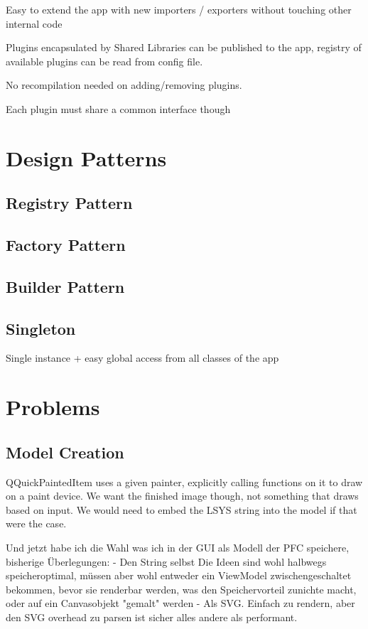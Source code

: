 Easy to extend the app with new importers / exporters without touching other internal code

Plugins encapsulated by Shared Libraries can be published to the app, registry of available plugins can be read from config file.

No recompilation needed on adding/removing plugins.

Each plugin must share a common interface though

\section{Design Patterns}
\subsection{Registry Pattern}

\subsection{Factory Pattern}

\subsection{Builder Pattern}

\subsection{Singleton}
Single instance + easy global access from all classes of the app


\section{Problems}
\subsection{Model Creation}
QQuickPaintedItem uses a given painter, explicitly calling functions on it to draw on a paint device.
We want the finished image though, not something that draws based on input. We would need to embed the LSYS string into the model if that were the case.

Und jetzt habe ich die Wahl was ich in der GUI als Modell der PFC speichere, bisherige Überlegungen:
- Den String selbst
Die Ideen sind wohl halbwegs speicheroptimal, müssen aber wohl entweder ein ViewModel zwischengeschaltet bekommen, bevor sie renderbar werden, was den Speichervorteil zunichte macht, oder auf ein Canvasobjekt "gemalt" werden
- Als SVG. Einfach zu rendern, aber den SVG overhead zu parsen ist sicher alles andere als performant.

